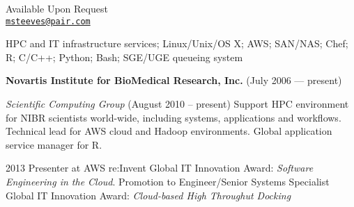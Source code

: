 \documentclass[11pt,article,oneside]{memoir}
\makeatletter
\def\myemail{msteeves@pair.com}
\def\myphone{Available Upon Request}
\makeatother
\begin{document}
\begin{minipage}[t]{2.95in}
  
\end{minipage}
\hfill
\hfill
\begin{minipage}[t]{1.3in}
  \flushright \footnotesize \addressblock \myphone \\
  {\scriptsize \texttt{\href{mailto:\myemail}{\myemail}}}
\end{minipage}

\medskip

\reversemarginpar

\bigskip


\noindent HPC and IT infrastructure services; Linux/Unix/OS X; AWS;
SAN/NAS; Chef; R; C/C++; Python; Bash; SGE/UGE queueing system

\bigskip

{}

\ind \textbf{Novartis Institute for BioMedical Research, Inc.} (July 2006 --- present)

\noindent\textit{Scientific Computing Group} (August 2010 -- present)
Support HPC environment for NIBR scientists world-wide, including
systems, applications and workflows. Technical lead for AWS cloud and
Hadoop environments. Global application service manager for R.

\ind \hspace{0.35in} \footnotesize 2013 Presenter at AWS
re:Invent Global IT Innovation Award:
\textit{Software Engineering in the Cloud}. Promotion to
Engineer/Senior Systems Specialist Global IT
Innovation Award: \textit{Cloud-based High Throughut Docking}
\normalsize \vspace{0.05in}
\end{document}
